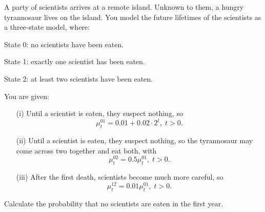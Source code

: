 A party of scientists arrives at a remote island. Unknown to them, a hungry tyrannosaur lives on the island. You model the future lifetimes of the scientists
as a three-state model, where: 
\begin{description}
 \item State 0: no scientists have been eaten.
 \item State 1: exactly one scientist has been eaten.
 \item State 2: at least two scientists have been eaten.
\end{description}
You are given:
\begin{itemize}
\item[(i)] Until a scientist is eaten, they suspect nothing, so
   \[ \mu_t^{01} = 0.01 + 0.02\cdot 2^t, \; t>0. \]
\item[(ii)] Until a scientist is eaten, they suspect nothing, so the tyrannosaur may come across two together and eat both, with
   \[ \mu_t^{02} = 0.5\mu_t^{01}, \; t>0. \]
 \item[(iii)] After the first death, scientists become much more careful, so
   \[ \mu_t^{12} = 0.01\mu_t^{01}, \; t>0. \]
\end{itemize}
Calculate the probability that no scientists are eaten in the first year.
